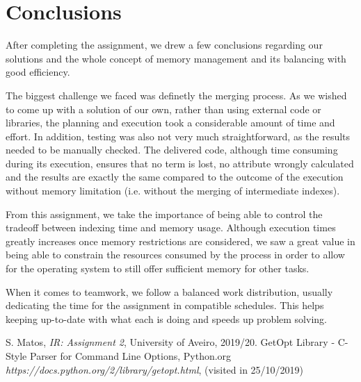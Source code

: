 \documentclass[12pt]{article}
\begin{document}
\newpage
\section*{Conclusions}

After completing the assignment, we drew a few conclusions regarding our
solutions and the whole concept of memory management and its balancing with
good efficiency.

The biggest challenge we faced was definetly the merging process.
As we wished to come up with a solution of our own, rather than using external code or 
libraries, the planning and execution took a considerable amount of time and effort.
In addition, testing was also not very much straightforward, as the results needed to
be manually checked.
The delivered code, although time consuming during its execution, ensures that no term
is lost, no attribute wrongly calculated and the results are exactly the same compared
to the outcome of the execution without memory limitation (i.e. without the merging of
intermediate indexes).

From this assignment, we take the importance of being able to control the tradeoff 
between indexing time and memory usage.
Although execution times greatly increases once memory restrictions are considered, we
saw a great value in being able to constrain the resources consumed by the process 
in order to allow for the operating system to still offer sufficient memory for other
tasks.

When it comes to teamwork, we follow a balanced work distribution, usually dedicating
the time for the assignment in compatible schedules. This helps keeping up-to-date with 
what each is doing and speeds up problem solving. 

\begin{thebibliography}{9}
  

    S. Matos,
    \textit{IR: Assignment 2},
    University of Aveiro,
    2019/20.
    GetOpt Library - C-Style Parser for Command Line Options,
    Python.org
    \textit{https://docs.python.org/2/library/getopt.html},
    (visited in 25/10/2019)
  
\end{thebibliography}

\clearpage
\end{document}
